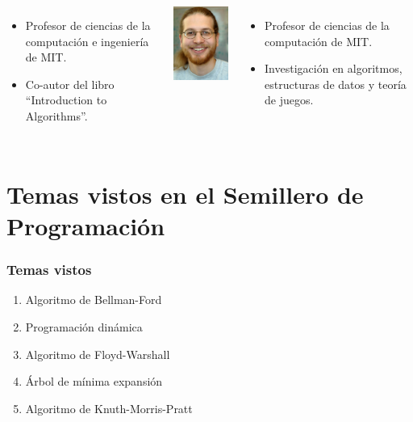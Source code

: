 \documentclass{beamer}
\begin{document}
\begin{frame}
\begin{columns}[l]
				\begin{itemize}
					\item Profesor de ciencias de la computación e ingeniería de MIT.
					\item Co-autor del libro ``Introduction to Algorithms''.
				\end{itemize}
				\begin{center} \includegraphics[height = 0.25\textheight]{Demaine.jpg} \end{center}
				\begin{itemize}
					\item Profesor de ciencias de la computación de MIT.
					\item Investigación en algoritmos, estructuras de datos y teoría de juegos.
				\end{itemize}
		\end{columns}
	\end{frame}
	
\section[Temas vistos]{Temas vistos en el Semillero de Programación}
	\begin{frame}
		\frametitle{Temas vistos}
		\begin{enumerate}
			\item{Algoritmo de Bellman-Ford}
			\item{Programación dinámica}
			\item{Algoritmo de Floyd-Warshall}
			\item{Árbol de mínima expansión}
			\item{Algoritmo de Knuth-Morris-Pratt}
		\end{enumerate}
	\end{frame}
\end{document}
